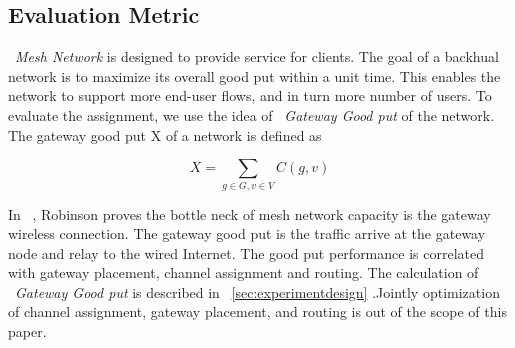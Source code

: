 \subsection{Evaluation Metric}
\label{subsec:metric}
~\emph{Mesh Network} is designed to provide service for clients. The goal of a backhual network is to maximize its overall good put within a unit time. 
This enables the network to support more end-user flows, and in turn more number of users. To evaluate the assignment, we use the idea of ~\emph{Gateway Good put} of the network. The gateway good put X of a network is defined as

\begin{equation}
\label{eq:goodput}
X=\sum_{g \in G, v \in V}C(g,v)
\end{equation}

In ~\cite{robinson2008adding}, Robinson proves the bottle neck of mesh network capacity is the gateway wireless connection. 
The gateway good put is the traffic arrive at the gateway node and relay to the wired Internet. The good put performance is correlated with gateway placement, channel assignment and routing. 
The calculation of ~\emph{Gateway Good put} is described in ~\ref{sec:experimentdesign} .Jointly optimization of channel assignment, gateway placement, and routing is out of the scope of this paper.

